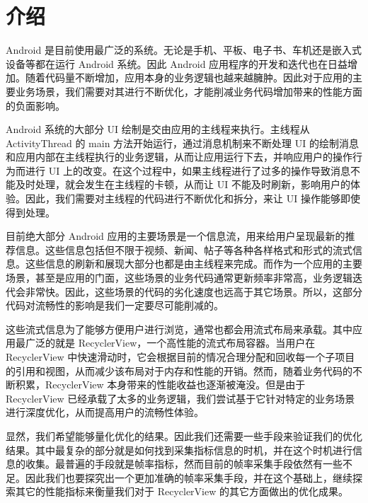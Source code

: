 \chapter{介绍}

Android 是目前使用最广泛的系统。无论是手机、平板、电子书、车机还是嵌入式设备等都在运行 Android 系统。因此 Android 应用程序的开发和迭代也在日益增加。随着代码量不断增加，应用本身的业务逻辑也越来越臃肿。因此对于应用的主要业务场景，我们需要对其进行不断优化，才能削减业务代码增加带来的性能方面的负面影响。

Android 系统的大部分 UI 绘制是交由应用的主线程来执行。主线程从 ActivityThread 的 main 方法开始运行，通过消息机制来不断处理 UI 的绘制消息和应用内部在主线程执行的业务逻辑，从而让应用运行下去，并响应用户的操作行为而进行 UI 上的改变。在这个过程中，如果主线程进行了过多的操作导致消息不能及时处理，就会发生在主线程的卡顿，从而让 UI 不能及时刷新，影响用户的体验。因此，我们需要对主线程的代码进行不断优化和拆分，来让 UI 操作能够即使得到处理。

目前绝大部分 Android 应用的主要场景是一个信息流，用来给用户呈现最新的推荐信息。这些信息包括但不限于视频、新闻、帖子等各种各样格式和形式的流式信息。这些信息的刷新和展现大部分也都是由主线程来完成。而作为一个应用的主要场景，甚至是应用的门面，这些场景的业务代码通常更新频率非常高，业务逻辑迭代会非常快。因此，这些场景的代码的劣化速度也远高于其它场景。所以，这部分代码对流畅性的影响是我们一定要尽可能削减的。

这些流式信息为了能够方便用户进行浏览，通常也都会用流式布局来承载。其中应用最广泛的就是 RecyclerView，一个高性能的流式布局容器。当用户在 RecyclerView 中快速滑动时，它会根据目前的情况合理分配和回收每一个子项目的引用和视图，从而减少该布局对于内存和性能的开销。然而，随着业务代码的不断积累，RecyclerView 本身带来的性能收益也逐渐被淹没。但是由于 RecyclerView 已经承载了太多的业务逻辑，我们尝试基于它针对特定的业务场景进行深度优化，从而提高用户的流畅性体验。

显然，我们希望能够量化优化的结果。因此我们还需要一些手段来验证我们的优化结果。其中最复杂的部分就是如何找到采集指标信息的时机，并在这个时机进行信息的收集。最普遍的手段就是帧率指标，然而目前的帧率采集手段依然有一些不足。因此我们也要探究出一个更加准确的帧率采集手段，并在这个基础上，继续探索其它的性能指标来衡量我们对于 RecyclerView 的其它方面做出的优化成果。